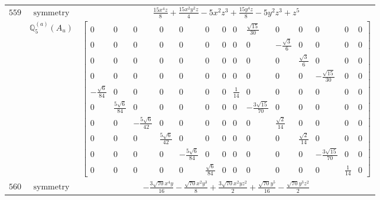 \documentclass[fleqn,8pt,landscape]{jsarticle}
\begin{document}
\begin{longtable}{ccc}
$ 559 $ & $ \text{symmetry} $ & $ \frac{15 x^{4} z}{8} + \frac{15 x^{2} y^{2} z}{4} - 5 x^{2} z^{3} + \frac{15 y^{4} z}{8} - 5 y^{2} z^{3} + z^{5} $ \\
$  $ & $ \mathbb{Q}_{5}^{(a)}(A_{u}) $ & $ \begin{bmatrix} 0 & 0 & 0 & 0 & 0 & 0 & 0 & 0 & \frac{\sqrt{15}}{30} & 0 & 0 & 0 & 0 & 0 \\ 0 & 0 & 0 & 0 & 0 & 0 & 0 & 0 & 0 & - \frac{\sqrt{3}}{6} & 0 & 0 & 0 & 0 \\ 0 & 0 & 0 & 0 & 0 & 0 & 0 & 0 & 0 & 0 & \frac{\sqrt{3}}{6} & 0 & 0 & 0 \\ 0 & 0 & 0 & 0 & 0 & 0 & 0 & 0 & 0 & 0 & 0 & - \frac{\sqrt{15}}{30} & 0 & 0 \\ - \frac{\sqrt{6}}{84} & 0 & 0 & 0 & 0 & 0 & 0 & \frac{1}{14} & 0 & 0 & 0 & 0 & 0 & 0 \\ 0 & \frac{5 \sqrt{6}}{84} & 0 & 0 & 0 & 0 & 0 & 0 & - \frac{3 \sqrt{15}}{70} & 0 & 0 & 0 & 0 & 0 \\ 0 & 0 & - \frac{5 \sqrt{6}}{42} & 0 & 0 & 0 & 0 & 0 & 0 & \frac{\sqrt{2}}{14} & 0 & 0 & 0 & 0 \\ 0 & 0 & 0 & \frac{5 \sqrt{6}}{42} & 0 & 0 & 0 & 0 & 0 & 0 & \frac{\sqrt{2}}{14} & 0 & 0 & 0 \\ 0 & 0 & 0 & 0 & - \frac{5 \sqrt{6}}{84} & 0 & 0 & 0 & 0 & 0 & 0 & - \frac{3 \sqrt{15}}{70} & 0 & 0 \\ 0 & 0 & 0 & 0 & 0 & \frac{\sqrt{6}}{84} & 0 & 0 & 0 & 0 & 0 & 0 & \frac{1}{14} & 0 \end{bmatrix} $ \\ \hline
$ 560 $ & $ \text{symmetry} $ & $ - \frac{3 \sqrt{70} x^{4} y}{16} - \frac{\sqrt{70} x^{2} y^{3}}{8} + \frac{3 \sqrt{70} x^{2} y z^{2}}{2} + \frac{\sqrt{70} y^{5}}{16} - \frac{\sqrt{70} y^{3} z^{2}}{2} $ \\

\end{longtable}
\end{document}
